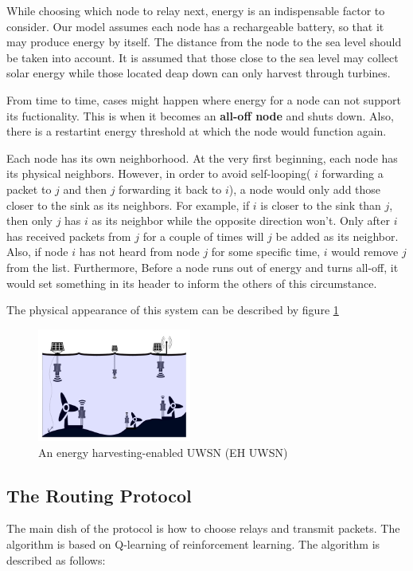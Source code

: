 \documentclass[10pt,twocolumn,letterpaper]{article}
\begin{document}
While choosing which node to relay next, energy is an indispensable factor to consider. Our model assumes each node has a rechargeable battery, so that it may produce energy by itself. The distance from the node to the sea level should be taken into account. It is assumed that those close to the sea level may collect solar energy while those located deap down can only harvest through turbines. 

From time to time, cases might happen where energy for a node can not support its fuctionality. This is when it becomes an \textbf{all-off node} and shuts down. Also, there is a restartint energy threshold at which the node would function again. 


Each node has its own neighborhood. At the very first beginning, each node has its physical neighbors. However, in order to avoid self-looping( $i$ forwarding a packet to $j$ and then $j$ forwarding it back to $i$), a node would only add those closer to the sink as its neighbors. For example, if $i$ is closer to the sink than $j$, then only $j$ has $i$ as its neighbor while the opposite direction won't. Only after $i$ has received packets from $j$ for a couple of times will $j$ be added as its neighbor. Also, if node $i$ has not heard from node $j$ for some specific time, $i$ would remove $j$ from the list. Furthermore, Before a node runs out of energy and turns all-off, it would set something in its header to inform the others of this circumstance.

The physical appearance of this system can be described by figure \ref{fig:EH}

\begin{figure}[htbp]
	\centering
	\includegraphics[width=0.45\textwidth]{figure/energy_harvest.jpg}
	\caption{An energy harvesting-enabled UWSN (EH UWSN)}
	\label{fig:EH}
\end{figure}

\subsection{The Routing Protocol}
The main dish of the protocol is how to choose relays and transmit packets. The algorithm is based on Q-learning of reinforcement learning. The algorithm is described as follows:
\end{document}
